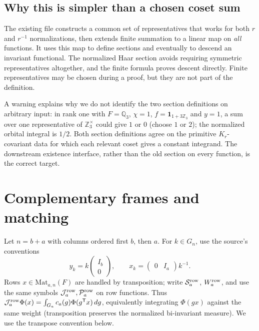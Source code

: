 \documentclass[11pt]{article}
\theoremstyle{remark}\newtheorem{remark}[theorem]{Remark}
\newcommand{\Mat}{\mathrm{Mat}}
\newcommand{\SB}{\mathcal S}
\newcommand{\Orb}{\mathcal J}
\newcommand{\Prj}{\mathcal P}
\newcommand{\one}{\mathbf 1}
\begin{document}
\subsection{Why this is simpler than a chosen coset sum}
The existing file constructs a common set of representatives that works for both $r$ and $r^{-1}$ normalizations, then extends finite summation to a linear map on \emph{all} functions. It uses this map to define sections and eventually to descend an invariant functional. The normalized Haar section avoids requiring symmetric representatives altogether, and the finite formula proves descent directly. Finite representatives may be chosen during a proof, but they are not part of the definition.

A warning explains why we do not identify the two section definitions on arbitrary input: in rank one with $F=\mathbb Q_3$, $\chi=1$, $f=\one_{1+3\mathbb Z_3}$ and $y=1$, a sum over one representative of $\mathbb Z_3^\times$ could give $1$ or $0$ (choose $1$ or $2$); the normalized orbital integral is $1/2$. Both section definitions agree on the primitive $K_r$-covariant data for which each relevant coset gives a constant integrand. The downstream existence interface, rather than the old section on every function, is the correct target.

\section{Complementary frames and matching}\label{sec:matching}
Let $n=b+a$ with columns ordered first $b$, then $a$. For $k\in G_n$, use the source's conventions
\[
 y_k=k\begin{pmatrix}I_b\\0\end{pmatrix},\qquad
 x_k=\begin{pmatrix}0&I_a\end{pmatrix}k^{-1}.
\]
Rows $x\in\Mat_{a,n}(F)$ are handled by transposition; write $\SB_a^{\rm row}$, $W_a^{\rm row}$, and use the same symbols $\Orb_a^{\rm row},\Prj_a^{\rm row}$ on row functions. Thus $\Orb_a^{\rm row}\Phi(x)=\int_{G_a} c_a(g)\Phi(g^{\mathsf T}x)\,dg$, equivalently integrating $\Phi(gx)$ against the same weight (transposition preserves the normalized bi-invariant measure). We use the transpose convention below.
\end{document}
